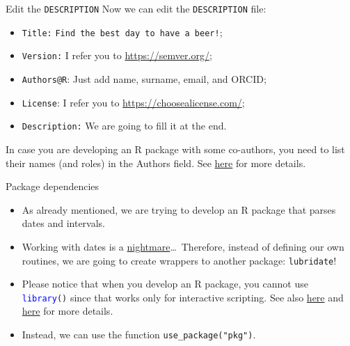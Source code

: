 \documentclass[
hyperref={bookmarks=false},
xcolor={dvipsnames,svgnames*,x11names*}, 
12pt
]{beamer}
\begin{document}
\begin{frame}{Edit the \texttt{DESCRIPTION}}
\vspace{-0.5cm}
Now we can edit the \texttt{DESCRIPTION} file:
\begin{itemize}
\itemsep 1ex
\item \texttt{Title:} \texttt{Find the best day to have a beer!};
\item \texttt{Version:} I refer you to \url{https://semver.org/}; 
\item \texttt{Authors@R}: Just add name, surname, email, and ORCID; 
\item \texttt{License}: I refer you to \url{https://choosealicense.com/};
\item \texttt{Description:} We are going to fill it at the end.
\end{itemize}
In case you are developing an R package with some co-authors, you need to list their names (and roles) in the Authors field. See \href{https://r-pkgs.org/description.html\#sec-description-authors-at-r}{here} for more details. 
\end{frame}

\begin{frame}[fragile]{Package dependencies}
\vspace{-0.5cm}
\begin{itemize}
\itemsep 2ex
\item As already mentioned, we are trying to develop an R package that parses dates and intervals. 
\item Working with dates is a \href{https://lubridate.tidyverse.org/articles/lubridate.html\#if-anyone-drove-a-time-machine-they-would-crash}{nightmare}\dots\, Therefore, instead of defining our own routines, we are going to create wrappers to another package: \texttt{lubridate}!
\item Please notice that when you develop an R package, you cannot use \texttt{\textcolor{blue}{library}()} since that works only for interactive scripting. See also \href{https://r-pkgs.org/dependencies-mindset-background.html}{here} and \href{https://r-pkgs.org/dependencies-in-practice.html}{here} for more details.  
\item Instead, we can use the function \texttt{use\_package(\textcolor{Rstring}{"pkg"})}. 
\end{itemize}
\end{frame}
\end{document}
